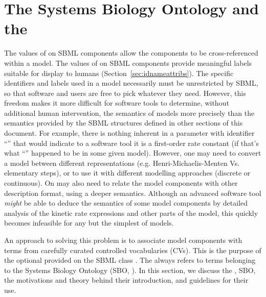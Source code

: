 
\section{The Systems Biology Ontology and the  }
\label{sec:sboTerm}
\label{sec:sbo}

The values of   on SBML components allow the
components to be cross-referenced within a model. The values of
  on SBML components provide meaningful labels
suitable for display to humans (Section~\ref{sec:idnameattribs}).
The specific identifiers and labels used in a model necessarily
must be unrestricted by SBML, so that software and users are free
to pick whatever they need.  However, this freedom makes it more
difficult for software tools to determine, without additional
human intervention, the semantics of models more precisely than
the semantics provided by the SBML structures defined in other
sections of this document. For example, there is nothing inherent
in a parameter with identifier ``'' that would indicate
to a software tool it is a first-order rate constant (if that's
what ``'' happened to be in some given model). However, one may need to convert a model between different representations (e.g. Henri-Michaelis-Menten Vs. elementary steps), or to use it with different modelling approaches (discrete or continuous). On may also need to relate the model components with other description format, using a deeper semantics. 
 Although an
advanced software tool \emph{might} be able to deduce the
semantics of some model components by detailed analysis of the
kinetic rate expressions and other parts of the model, this
quickly becomes infeasible for any but the simplest of models.

An approach to solving this problem is to associate model
components with terms from carefully curated controlled vocabularies
(CVs).  This is the purpose of the optional  
provided on the SBML class \SBase.  The 
 always refers to terms belonging to the Systems Biology Ontology
(SBO, \sboref). In this section, we discuss the  , SBO,
the motivations and theory behind their introduction, and
guidelines for their use.


